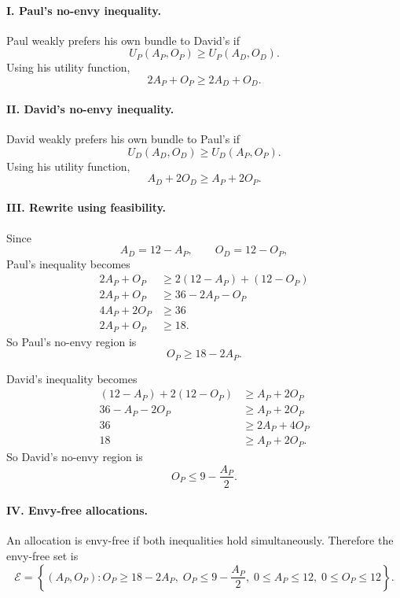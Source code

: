 \documentclass[12pt]{article}
\begin{document}
\begin{enumerate}[label=(\alph*)]
    \paragraph{I. Paul's no-envy inequality.}
    Paul weakly prefers his own bundle to David's if
    \[
    U_P(A_P,O_P)\ge U_P(A_D,O_D).
    \]
    Using his utility function,
    \[
    2A_P+O_P\ge 2A_D+O_D.
    \]

    \paragraph{II. David's no-envy inequality.}
    David weakly prefers his own bundle to Paul's if
    \[
    U_D(A_D,O_D)\ge U_D(A_P,O_P).
    \]
    Using his utility function,
    \[
    A_D+2O_D\ge A_P+2O_P.
    \]

    \paragraph{III. Rewrite using feasibility.}
    Since
    \[
    A_D=12-A_P,\qquad O_D=12-O_P,
    \]
    Paul's inequality becomes
    \begin{align*}
        2A_P+O_P &\ge 2(12-A_P)+(12-O_P)\\
        2A_P+O_P &\ge 36-2A_P-O_P\\
        4A_P+2O_P &\ge 36\\
        2A_P+O_P &\ge 18.
    \end{align*}
    So Paul's no-envy region is
    \[
    \boxed{O_P\ge 18-2A_P.}
    \]

    David's inequality becomes
    \begin{align*}
        (12-A_P)+2(12-O_P) &\ge A_P+2O_P\\
        36-A_P-2O_P &\ge A_P+2O_P\\
        36 &\ge 2A_P+4O_P\\
        18 &\ge A_P+2O_P.
    \end{align*}
    So David's no-envy region is
    \[
    \boxed{O_P\le 9-\frac{A_P}{2}.}
    \]

    \paragraph{IV. Envy-free allocations.}
    An allocation is envy-free if both inequalities hold simultaneously. Therefore the envy-free set is
    \[
    \boxed{\mathcal E
    =\left\{(A_P,O_P):
    O_P\ge 18-2A_P,\;
    O_P\le 9-\frac{A_P}{2},\;
    0\le A_P\le 12,\;
    0\le O_P\le 12
    \right\}.}
    \]


\end{enumerate}
\end{document}
